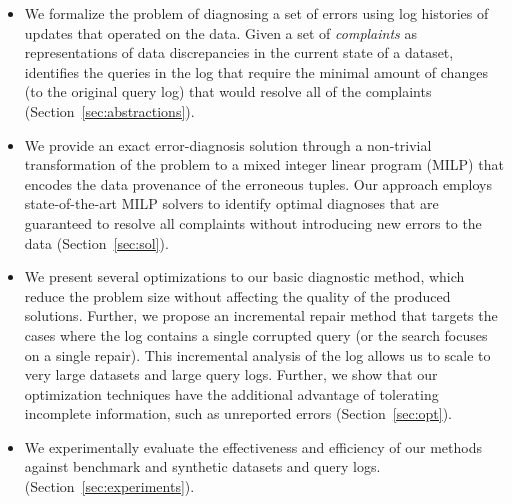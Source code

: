 \begin{itemize}[leftmargin=*, topsep=0mm, itemsep=0mm]      
    \item We formalize the problem of diagnosing a set of errors using log
    histories of updates that operated on the data. Given a set of 
    \emph{complaints} as representations of data discrepancies in the current
    state of a dataset, \sys identifies the queries in the log that require the  minimal
    amount of changes (to the original query log) 
    that would resolve all of the complaints (Section~\ref{sec:abstractions}).
      
    \item We provide an exact error-diagnosis solution through a non-trivial
    transformation of the problem to a mixed integer linear program (MILP) that
    encodes the data provenance of the erroneous tuples. Our approach employs state-of-the-art MILP solvers to identify
    optimal diagnoses that are guaranteed to resolve all complaints without introducing new errors to the data
    (Section~\ref{sec:sol}).
    
    \item We present several optimizations to our basic diagnostic
    method, which reduce the problem size without affecting the
    quality of the produced solutions. Further, we propose an
    incremental repair method that targets the cases where the log
    contains a single corrupted query (or the search focuses on a
    single repair). This incremental analysis of the log allows us to
    scale to very large datasets and large query logs. Further, we
    show that our optimization techniques have the additional
    advantage of tolerating incomplete information, such as unreported
    errors (Section~\ref{sec:opt}).

    
    
    \item We experimentally evaluate the effectiveness and efficiency of our
    methods against benchmark and synthetic datasets and query logs. 
    (Section~\ref{sec:experiments}). 
\end{itemize}

